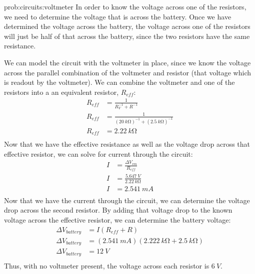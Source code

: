 \begin{solution}{prob:circuits:voltmeter}\label{soln:circuits:voltmeter} In order to know the voltage across one of the resistors, we need to determine the voltage that is across the battery. Once we have determined the voltage across the battery, the voltage across one of the resistors will just be half of that across the battery, since the two resistors have the same resistance.

We can model the circuit with the voltmeter in place, since we know the voltage across the parallel combination of the voltmeter and resistor (that voltage which is readout by the voltmeter). We can combine the voltmeter and one of the resistors into a an equivalent resistor, $R_{eff}$:
\begin{align*}
R_{eff} &= \frac{1}{R_V^{-1}+R^{-1}}\\
R_{eff} &= \frac{1}{(\SI{20}{k\ohm})^{-1}+(\SI{2.5}{k\ohm})^{-1}}\\
R_{eff} &= \SI{2.22}{k\ohm}\\
\end{align*}
Now that we have the effective resistance as well as the voltage drop across that effective resistor, we can solve for current through the circuit:
\begin{align*}
I &= \frac{\Delta V_{vm}}{R_{eff}}\\
I &= \frac{\SI{5.647}{V}}{\SI{2.22}{k\ohm}}\\
I &= \SI{2.541}{mA}\\
\end{align*}
Now that we have the current through the circuit, we can determine the voltage drop across the second resistor. By adding that voltage drop to the known voltage across the effective resistor, we can determine the battery voltage:
\begin{align*}
\Delta V_{battery} &= I(R_{eff}+R)\\
\Delta V_{battery} &= (\SI{2.541}{mA})(\SI{2.222}{k\ohm}+\SI{2.5}{k\ohm})\\
\Delta V_{battery} &= \SI{12}{V}\\
\end{align*}
Thus, with no voltmeter present, the voltage across each resistor is $\SI{6}{V}$.
\end{solution}

